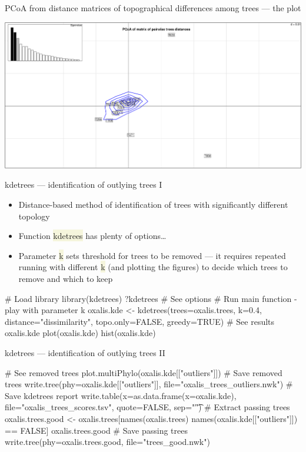 \documentclass[compress, ucs, xelatex, 11pt, xcolor=svgnames, aspectratio=169,
	hyperref={
		bookmarks=true,
		unicode=true,
		colorlinks=true,
		pdftitle={Molecular data in R},
		plainpages=false,
		pdfauthor={Vojtech Zeisek},
		pdfsubject={Course about phylogeny and evolution in R},
		pdfcreator={XeLaTeX},
		pdfkeywords={R, evolution, phylogeny, molecular data},
		linkcolor=Crimson, %
		anchorcolor=Magenta, %
		citecolor=Magenta, %
		filecolor=Magenta, %
		menucolor=Magenta, %
		urlcolor=DodgerBlue, %
		pdftex},
	url={hyphens, lowtilde} %
	]{beamer}
\renewcommand{\texttt}[1]{\colorbox{Beige}{{\ttfamily #1}}}
\begin{document}
\begin{frame}{PCoA from distance matrices of topographical differences among trees --- the plot}
	\begin{center}
		\includegraphics[width=\textwidth-3.5cm]{pcoa-trees.png}
	\end{center}
\end{frame}

\begin{frame}[fragile]{kdetrees --- identification of outlying trees I}
	\begin{itemize}
		\item Distance-based method of identification of trees with significantly different topology
		\item Function \texttt{kdetrees} has plenty of options\ldots
		\item Parameter \texttt{k} sets threshold for trees to be removed --- it requires repeated running with different \texttt{k} (and plotting the figures) to decide which trees to remove and which to keep
	\end{itemize}
	\begin{spluscode}
    # Load library
    library(kdetrees)
    ?kdetrees # See options
    # Run main function - play with parameter k
    oxalis.kde <- kdetrees(trees=oxalis.trees, k=0.4,
      distance="dissimilarity", topo.only=FALSE, greedy=TRUE)
    # See results
    oxalis.kde
    plot(oxalis.kde)
    hist(oxalis.kde)
	\end{spluscode}
\end{frame}

\begin{frame}[fragile]{kdetrees --- identification of outlying trees II}
	\begin{spluscode}
    # See removed trees
    plot.multiPhylo(oxalis.kde[["outliers"]])
    # Save removed trees
    write.tree(phy=oxalis.kde[["outliers"]], file="oxalis_trees_outliers.nwk")
    # Save kdetrees report
    write.table(x=as.data.frame(x=oxalis.kde), file="oxalis_trees_scores.tsv",
      quote=FALSE, sep="\t")
    # Extract passing trees
    oxalis.trees.good <- oxalis.trees[names(oxalis.trees) %
      names(oxalis.kde[["outliers"]]) == FALSE]
    oxalis.trees.good
    # Save passing trees
    write.tree(phy=oxalis.trees.good, file="trees_good.nwk")
	\end{spluscode}
\end{frame}
\end{document}
